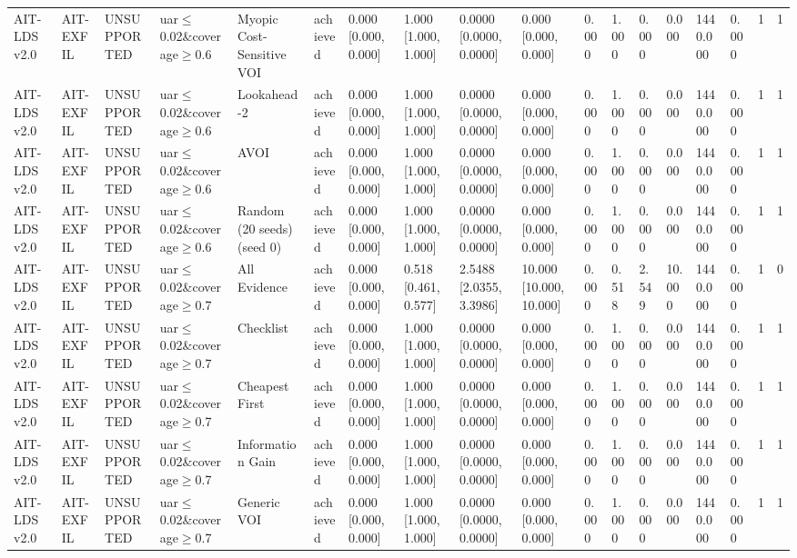 \begin{table}[!ht]
{\begin{tabular}{llllllllllllllllll}
AIT-LDS v2.0 & AIT-EXFIL & UNSUPPORTED & uar$\le$0.02\&coverage$\ge$0.6 & Myopic Cost-Sensitive VOI & achieved & 0.000 [0.000, 0.000] & 1.000 [1.000, 1.000] & 0.0000 [0.0000, 0.0000] & 0.000 [0.000, 0.000] & 0.000 & 1.000 & 0.000 & 0.000 & 1440.000 & 0.000 & 1 & 1 \\
AIT-LDS v2.0 & AIT-EXFIL & UNSUPPORTED & uar$\le$0.02\&coverage$\ge$0.6 & Lookahead-2 & achieved & 0.000 [0.000, 0.000] & 1.000 [1.000, 1.000] & 0.0000 [0.0000, 0.0000] & 0.000 [0.000, 0.000] & 0.000 & 1.000 & 0.000 & 0.000 & 1440.000 & 0.000 & 1 & 1 \\
AIT-LDS v2.0 & AIT-EXFIL & UNSUPPORTED & uar$\le$0.02\&coverage$\ge$0.6 & AVOI & achieved & 0.000 [0.000, 0.000] & 1.000 [1.000, 1.000] & 0.0000 [0.0000, 0.0000] & 0.000 [0.000, 0.000] & 0.000 & 1.000 & 0.000 & 0.000 & 1440.000 & 0.000 & 1 & 1 \\
AIT-LDS v2.0 & AIT-EXFIL & UNSUPPORTED & uar$\le$0.02\&coverage$\ge$0.6 & Random (20 seeds) (seed 0) & achieved & 0.000 [0.000, 0.000] & 1.000 [1.000, 1.000] & 0.0000 [0.0000, 0.0000] & 0.000 [0.000, 0.000] & 0.000 & 1.000 & 0.000 & 0.000 & 1440.000 & 0.000 & 1 & 1 \\
AIT-LDS v2.0 & AIT-EXFIL & UNSUPPORTED & uar$\le$0.02\&coverage$\ge$0.7 & All Evidence & achieved & 0.000 [0.000, 0.000] & 0.518 [0.461, 0.577] & 2.5488 [2.0355, 3.3986] & 10.000 [10.000, 10.000] & 0.000 & 0.518 & 2.549 & 10.000 & 1440.000 & 0.000 & 1 & 0 \\
AIT-LDS v2.0 & AIT-EXFIL & UNSUPPORTED & uar$\le$0.02\&coverage$\ge$0.7 & Checklist & achieved & 0.000 [0.000, 0.000] & 1.000 [1.000, 1.000] & 0.0000 [0.0000, 0.0000] & 0.000 [0.000, 0.000] & 0.000 & 1.000 & 0.000 & 0.000 & 1440.000 & 0.000 & 1 & 1 \\
AIT-LDS v2.0 & AIT-EXFIL & UNSUPPORTED & uar$\le$0.02\&coverage$\ge$0.7 & Cheapest First & achieved & 0.000 [0.000, 0.000] & 1.000 [1.000, 1.000] & 0.0000 [0.0000, 0.0000] & 0.000 [0.000, 0.000] & 0.000 & 1.000 & 0.000 & 0.000 & 1440.000 & 0.000 & 1 & 1 \\
AIT-LDS v2.0 & AIT-EXFIL & UNSUPPORTED & uar$\le$0.02\&coverage$\ge$0.7 & Information Gain & achieved & 0.000 [0.000, 0.000] & 1.000 [1.000, 1.000] & 0.0000 [0.0000, 0.0000] & 0.000 [0.000, 0.000] & 0.000 & 1.000 & 0.000 & 0.000 & 1440.000 & 0.000 & 1 & 1 \\
AIT-LDS v2.0 & AIT-EXFIL & UNSUPPORTED & uar$\le$0.02\&coverage$\ge$0.7 & Generic VOI & achieved & 0.000 [0.000, 0.000] & 1.000 [1.000, 1.000] & 0.0000 [0.0000, 0.0000] & 0.000 [0.000, 0.000] & 0.000 & 1.000 & 0.000 & 0.000 & 1440.000 & 0.000 & 1 & 1 \\

\end{tabular}}
\end{table}
